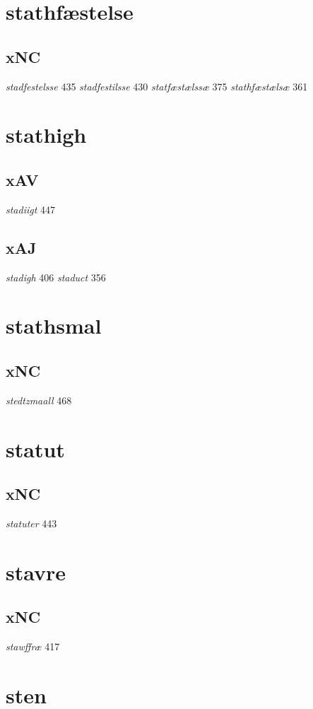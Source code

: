 \documentclass[a4paper,twocolumn]{article}
\begin{document}
\section{stathfæstelse}
\label{sec:org7169247}
\subsection{xNC}
\label{sec:orgba1ac1c}
\emph{stadfestelsse} 435 \emph{stadfestilsse} 430 \emph{statfæstælssæ} 375 \emph{stathfæstælsæ} 361 
\section{stathigh}
\label{sec:org5fd3c0d}
\subsection{xAV}
\label{sec:org95a5b52}
\emph{stadiigt} 447 
\subsection{xAJ}
\label{sec:orgc63a741}
\emph{stadigh} 406 \emph{staduct} 356 
\section{stathsmal}
\label{sec:org15a98c7}
\subsection{xNC}
\label{sec:org3227c34}
\emph{stedtzmaall} 468 
\section{statut}
\label{sec:orgdcd0b4f}
\subsection{xNC}
\label{sec:orgfd07943}
\emph{statuter} 443 
\section{stavre}
\label{sec:orgac9a499}
\subsection{xNC}
\label{sec:org6c407f4}
\emph{stawffræ} 417 
\section{sten}
\label{sec:org0a14f0b}
\end{document}
